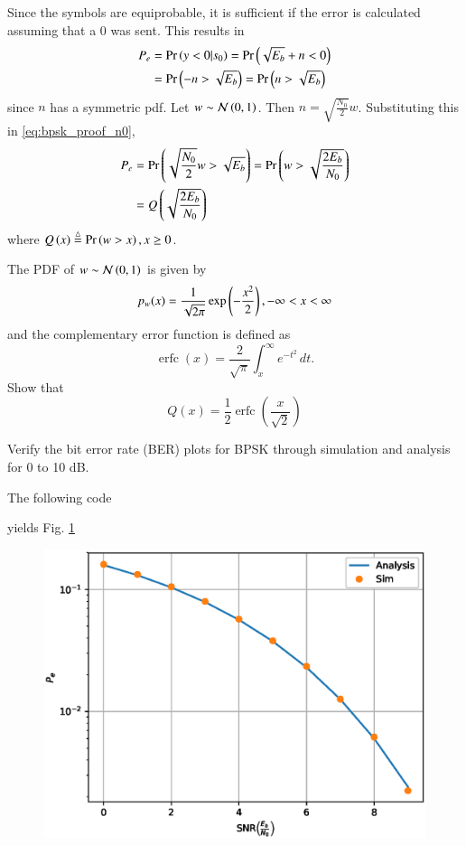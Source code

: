 \documentclass[journal,12pt,twocolumn]{IEEEtran}
\begin{document}
\solution
Since the symbols are equiprobable, it is sufficient if the error is calculated assuming that a 0 was sent.  This results in
\begin{align}
P_e &= \Pr\left(y < 0|s_0\right) = \Pr\left(\sqrt{E_b} + n < 0\right)
\\
&= \Pr\left( -n > \sqrt{E_b} \right) = \Pr\left( n > \sqrt{E_b} \right)
\label{eq:bpsk_proof_n0}
\end{align}
since $n$ has a symmetric pdf.
Let $w \sim \mathcal{N}\left(0,1\right)$.  Then $n = \sqrt{\frac{N_0}{2}}w$. Substituting this in \eqref{eq:bpsk_proof_n0},
\begin{align}
P_e &=  \Pr\left( \sqrt{\frac{N_0}{2}}w > \sqrt{E_b} \right) = \Pr\left( w > \sqrt{\frac{2E_b}{N_0}} \right)
\\
&= Q\left(\sqrt{\frac{2E_b}{N_0}}\right)
\end{align}
%
where $Q\left(x\right) \stackrel{\triangle}{=} \Pr\left(w > x\right), x \ge 0$.
\begin{problem}
The PDF of $w \sim \mathcal{N}\left(0,1\right)$ is given by
%
\begin{equation}
p_{w}(x) = \frac{1}{\sqrt{2\pi}}\exp\left(-\frac{x^2}{2}\right), -\infty < x < \infty
\end{equation}
and the complementary error function is defined as
\begin{equation}
\operatorname {erfc} (x)={\frac {2}{\sqrt {\pi }}}\int _{x}^{\infty }e^{-t^{2}}\,dt.
\end{equation}
%
Show that 
\begin{equation}
Q(x) = \frac{1}{2}\operatorname {erfc}\left({\frac  {x}{{\sqrt  {2}}}}\right)
\end{equation}
\end{problem}
\begin{problem}
Verify the bit error rate (BER) plots for BPSK through simulation and analysis for 0 to 10 dB.
\end{problem}
\solution
The following code

yields Fig. \ref{fig:bpsk_ber}
\begin{figure}[!h]
\centering
\includegraphics[width=\columnwidth]{./figs/bpsk_ber.eps}
\caption{}
\label{fig:bpsk_ber}
\end{figure}
\end{document}
